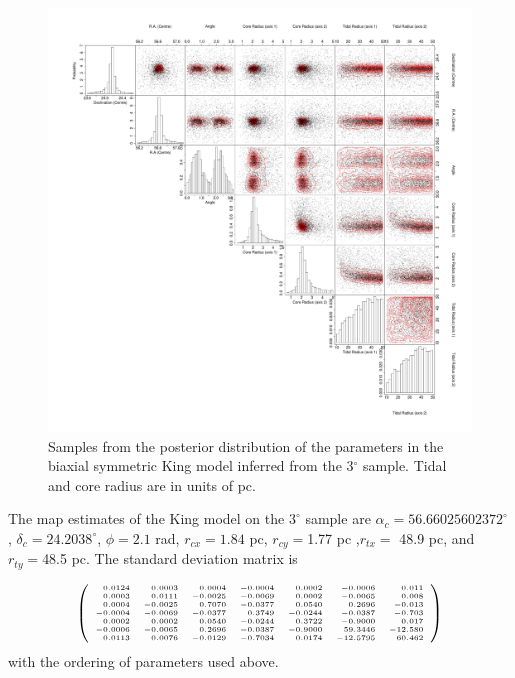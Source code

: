 \begin{figure}[ht!]
 \centering
  \includegraphics[width=\textwidth]{background/Figures/PSD/KingEll7.pdf}
  \caption{Samples from the posterior distribution of the parameters in the biaxial symmetric King model inferred from the 3$^{\circ}$ sample. Tidal and core radius are in units of pc.}
\label{fig:KingEll7}
\end {figure}

The \gls{map} estimates of the King model on the $3^{\circ}$ sample are $\alpha_c=56.66025602372^{\circ}$ , $\delta_c=24.2038 ^{\circ}$, $\phi=2.1$ rad, $r_{cx}=1.84$ pc, $r_{cy}=$1.77 pc ,$r_{tx}=$ 48.9 pc, and $r_{ty}=$48.5 pc. The standard deviation matrix is

$$
\tiny
\left(\begin{array}{rrrrrrr}
 0.0124 & 0.0003 & 0.0004 &-0.0004 & 0.0002 & -0.0006 &  0.011\\
 0.0003 & 0.0111 &-0.0025 &-0.0069 & 0.0002 & -0.0065 &  0.008\\
 0.0004 &-0.0025 & 0.7070 &-0.0377 & 0.0540 &  0.2696 & -0.013\\
-0.0004 &-0.0069 &-0.0377 & 0.3749 &-0.0244 & -0.0387 & -0.703\\
 0.0002 & 0.0002 & 0.0540 &-0.0244 & 0.3722 & -0.9000 &  0.017\\
-0.0006 &-0.0065 & 0.2696 &-0.0387 &-0.9000 & 59.3446 &-12.580\\
 0.0113 & 0.0076 &-0.0129 &-0.7034 & 0.0174 &-12.5795 & 60.462\\
\end{array}\right)
$$
with the ordering of parameters used above.


